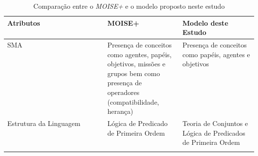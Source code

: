 \begin{center}
\begin{longtable}[H]{|l|p{0.3\linewidth}|p{0.3\linewidth}|}
\\ \hline

\newpage

\hline
\textbf{Atributos}
& 
\textbf{MOISE+}  
& 
\textbf{Modelo deste Estudo} 

\\ \hline

SMA        		
& 
Presença de conceitos como agentes, papéis, objetivos, missões e grupos bem como presença de  operadores (compatibilidade, herança)  
& 
Presença de conceitos como papéis, agentes e objetivos

\\ \hline
Estrutura da Linguagem
& 
Lógica de Predicado de Primeira Ordem 
&
Teoria de Conjuntos e Lógica de Predicados de Primeira Ordem

\\ \hline
\caption{Comparação entre o \textit{MOISE+} e o modelo proposto neste estudo}
\label{genmoise1}
\end{longtable}
\end{center}